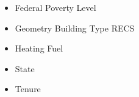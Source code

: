 \begin{itemize}
\item Federal Poverty Level
\item Geometry Building Type RECS
\item Heating Fuel
\item State
\item Tenure
\end{itemize}

